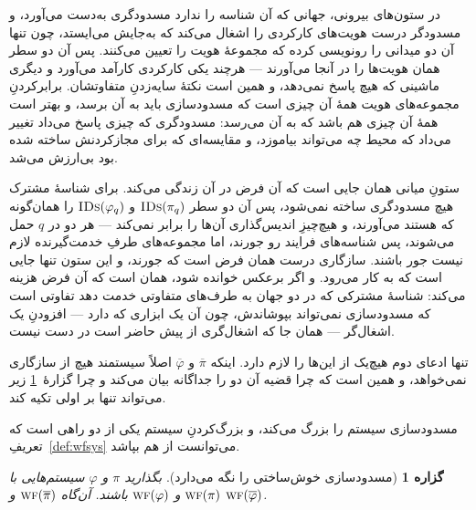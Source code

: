 \documentclass[10pt,oneside,openany]{book}
\newcommand{\WF}{\op{wf}}
\newcommand{\op}[1]{\textnormal{\textsc{#1}}}
\newcommand{\IDs}{\op{IDs}}
\theoremstyle{accentdef}
\theoremstyle{accentplain}
\newtheorem{proposition}[definition]{گزاره}
\begin{document}
در ستون‌های بیرونی، جهانی که آن شناسه را ندارد مسدودگری به‌دست می‌آورد، و
مسدودگر درست هویت‌های کارکردی را اشغال می‌کند که به‌جایش می‌ایستد، چون تنها
آن دو میدانی را رونویسی کرده که مجموعهٔ هویت را تعیین می‌کنند. پس آن دو
سطر همان هویت‌ها را در آنجا می‌آورند --- هرچند یکی کارکردی کارآمد می‌آورد و
دیگری ماشینی که هیچ پاسخ نمی‌دهد، و همین است نکتهٔ سایه‌زدنِ متفاوتشان.
برابرکردنِ مجموعه‌های هویت همهٔ آن چیزی است که مسدودسازی باید به آن برسد، و
بهتر است همهٔ آن چیزی هم باشد که به آن می‌رسد: مسدودگری که چیزی پاسخ می‌داد
تغییر می‌داد که محیط چه می‌تواند بیاموزد، و مقایسه‌ای که برای مجازکردنش
ساخته شده بود بی‌ارزش می‌شد.

ستونِ میانی همان جایی است که آن فرض در آن زندگی می‌کند. برای شناسهٔ مشترک
هیچ مسدودگری ساخته نمی‌شود، پس آن دو سطر $\IDs(\pi_q)$ و $\IDs(\varphi_q)$
را همان‌گونه که هستند می‌آورند، و هیچ‌چیزِ اندیس‌گذاری آن‌ها را برابر
نمی‌کند --- هر دو در $q$ حمل می‌شوند، پس شناسه‌های فرایند رو جورند، اما
مجموعه‌های طرفِ خدمت‌گیرنده لازم نیست جور باشند. سازگاری درست همان فرض است
که جورند، و این ستون تنها جایی است که به کار می‌رود. و اگر برعکس خوانده
شود، همان است که آن فرض هزینه می‌کند: شناسهٔ مشترکی که در دو جهان به
طرف‌های متفاوتی خدمت دهد تفاوتی است که مسدودسازی نمی‌تواند بپوشاندش، چون آن
یک ابزاری که دارد --- افزودنِ یک اشغال‌گر --- همان جا که اشغال‌گری از پیش
حاضر است در دست نیست.

تنها ادعای دوم هیچ‌یک از این‌ها را لازم دارد. اینکه $\overline{\pi}$ و
$\overline{\varphi}$ اصلاً سیستمند هیچ از سازگاری نمی‌خواهد، و همین است که
چرا قضیه آن دو را جداگانه بیان می‌کند و چرا گزارهٔ~\ref{prop:wfblk}ِ زیر
می‌تواند تنها بر اولی تکیه کند.

مسدودسازی سیستم را بزرگ می‌کند، و بزرگ‌کردنِ سیستم یکی از دو راهی است که
تعریفِ~\ref{def:wfsys} می‌توانست از هم بپاشد.

\begin{proposition}[مسدودسازی خوش‌ساختی را نگه می‌دارد]\label{prop:wfblk}
بگذارید $\pi$ و $\varphi$ سیستم‌هایی با $\WF(\pi)$ و $\WF(\varphi)$ باشند.
آن‌گاه $\WF(\overline{\pi})$ و $\WF(\overline{\varphi})$.
\end{proposition}
\end{document}
